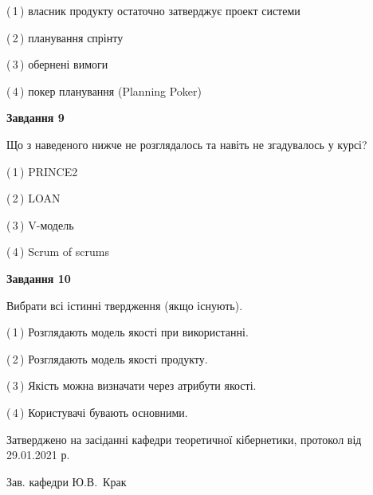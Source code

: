 \documentclass[10pt, ukrainian]{article}
\begin{document}
{\begin {large}
(\,1\,) власник продукту остаточно затверджує проект системи%



(\,2\,) планування спрінту%



(\,3\,) обернені вимоги%



(\,4\,) покер планування (Planning Poker)%


{\begin {center}\textbf{Завдання 9}\end {center}}\par
Що з наведеного нижче не розглядалось та навіть не згадувалось у курсі?\par
\vspace{2mm}



(\,1\,) PRINCE2%



(\,2\,) LOAN%



(\,3\,) V-модель%



(\,4\,) Scrum of scrums%


{\begin {center}\textbf{Завдання 10}\end {center}}\par
Вибрати всі істинні твердження (якщо існують).\par
\vspace{2mm}



(\,1\,) Розглядають модель якості при використанні.%



(\,2\,) Розглядають модель якості продукту.%



(\,3\,) Якість можна визначати через атрибути якості.%



(\,4\,) Користувачі бувають основними.%



\end {large}}
{\vspace{5mm}\smallskip \begin {small} Затверджено на засіданні кафедри теоретичної кібернетики, протокол  від   29.01.2021 р.\par\smallskip\smallskip
{\parbox {6.5 cm}{Зав. кафедри \dotfill Ю.В.~Крак}} \end{small}}
\newpage
\end{document}
